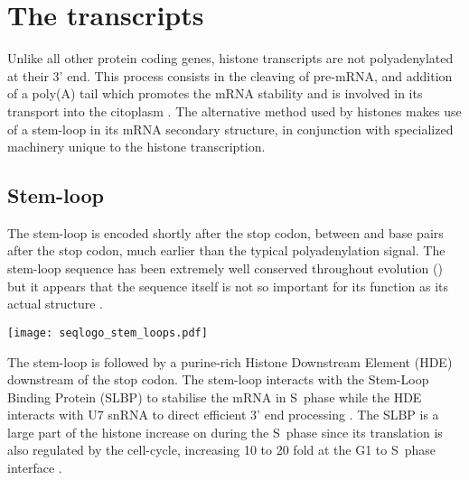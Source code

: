\section{The transcripts}

  Unlike all other protein coding genes, histone transcripts are not polyadenylated at
  their 3' end. This process consists in the cleaving of pre-mRNA, and addition of a
  poly(A) tail which promotes the mRNA stability and is involved in its transport
  into the citoplasm \citep{mRNA-end-processing}. The alternative method used by
  histones makes use of a stem-loop in its mRNA secondary structure, in conjunction
  with specialized machinery unique to the histone transcription.


  \subsection{Stem-loop}
    The stem-loop is encoded shortly after the stop codon, between \StemLoopStart{} and
    \StemLoopEnd{} base pairs after the stop codon, much earlier than the typical
    polyadenylation signal. The stem-loop sequence has been extremely well conserved
    throughout evolution () but it appears that the
    sequence itself is not so important for its function as its actual structure
    \citep{stem-loop-structure}.

    \begin{figure*}
      \centering
      \texttt{[image: seqlogo\_stem\_loops.pdf]}
      \label{fig:stem-loop-seqlogo}
    \end{figure*}

    The stem-loop is followed by a purine-rich Histone Downstream Element (HDE)
    downstream of the stop codon. The stem-loop interacts with the Stem-Loop
    Binding Protein (SLBP) to stabilise the mRNA in S~phase \citep{SLBP-regulation}
    while the HDE interacts with U7 snRNA to direct efficient 3' end processing
    \citep{HDE-sequence}. The SLBP is a large part of the histone increase on
    during the S~phase since its translation is also regulated
    by the cell-cycle, increasing 10 to 20 fold at the G1 to S~phase
    interface \citep{SLBP-regulation}.

